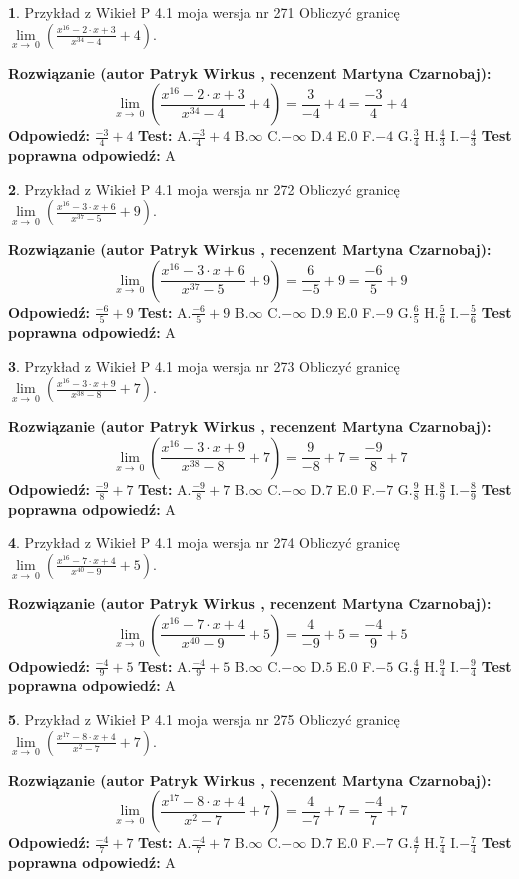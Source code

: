 \documentclass[12pt, a4paper]{article}
\theoremstyle{definition} %
\newtheorem{zad}{}
\newcommand{\zadStart}[1]{\begin{zad}#1\newline}
\newcommand{\zadStop}{\end{zad}}
\newcommand{\rozwStart}[2]{\noindent \textbf{Rozwiązanie (autor #1 , recenzent #2): }\newline}
\newcommand{\rozwStop}{\newline}
\newcommand{\odpStart}{\noindent \textbf{Odpowiedź:}\newline}
\newcommand{\odpStop}{\newline}
\newcommand{\testStart}{\noindent \textbf{Test:}\newline}
\newcommand{\testStop}{\newline}
\newcommand{\kluczStart}{\noindent \textbf{Test poprawna odpowiedź:}\newline}
\newcommand{\kluczStop}{\newline}
\begin{document}
\zadStart{Przykład z Wikieł P 4.1 moja wersja nr 271}
Obliczyć granicę $\lim\limits_{x\to\ 0}(\frac{x^{16}-2 \cdot x +3}{x^{34}-4}+4)$.
\zadStop
\rozwStart{Patryk Wirkus}{Martyna Czarnobaj}
$$\lim\limits_{x\to\ 0}(\frac{x^{16}-2 \cdot x +3}{x^{34}-4}+4)=\frac{3}{-4}+4=\frac{-3}{4}+4$$
\rozwStop
\odpStart
$\frac{-3}{4}+4$
\odpStop
\testStart
A.$\frac{-3}{4}+4$
B.$\infty$
C.$-\infty$
D.$4$
E.$0$
F.$-4$
G.$\frac{3}{4}$
H.$\frac{4}{3}$
I.$-\frac{4}{3}$
\testStop
\kluczStart
A
\kluczStop



\zadStart{Przykład z Wikieł P 4.1 moja wersja nr 272}
Obliczyć granicę $\lim\limits_{x\to\ 0}(\frac{x^{16}-3 \cdot x +6}{x^{37}-5}+9)$.
\zadStop
\rozwStart{Patryk Wirkus}{Martyna Czarnobaj}
$$\lim\limits_{x\to\ 0}(\frac{x^{16}-3 \cdot x +6}{x^{37}-5}+9)=\frac{6}{-5}+9=\frac{-6}{5}+9$$
\rozwStop
\odpStart
$\frac{-6}{5}+9$
\odpStop
\testStart
A.$\frac{-6}{5}+9$
B.$\infty$
C.$-\infty$
D.$9$
E.$0$
F.$-9$
G.$\frac{6}{5}$
H.$\frac{5}{6}$
I.$-\frac{5}{6}$
\testStop
\kluczStart
A
\kluczStop



\zadStart{Przykład z Wikieł P 4.1 moja wersja nr 273}
Obliczyć granicę $\lim\limits_{x\to\ 0}(\frac{x^{16}-3 \cdot x +9}{x^{38}-8}+7)$.
\zadStop
\rozwStart{Patryk Wirkus}{Martyna Czarnobaj}
$$\lim\limits_{x\to\ 0}(\frac{x^{16}-3 \cdot x +9}{x^{38}-8}+7)=\frac{9}{-8}+7=\frac{-9}{8}+7$$
\rozwStop
\odpStart
$\frac{-9}{8}+7$
\odpStop
\testStart
A.$\frac{-9}{8}+7$
B.$\infty$
C.$-\infty$
D.$7$
E.$0$
F.$-7$
G.$\frac{9}{8}$
H.$\frac{8}{9}$
I.$-\frac{8}{9}$
\testStop
\kluczStart
A
\kluczStop



\zadStart{Przykład z Wikieł P 4.1 moja wersja nr 274}
Obliczyć granicę $\lim\limits_{x\to\ 0}(\frac{x^{16}-7 \cdot x +4}{x^{40}-9}+5)$.
\zadStop
\rozwStart{Patryk Wirkus}{Martyna Czarnobaj}
$$\lim\limits_{x\to\ 0}(\frac{x^{16}-7 \cdot x +4}{x^{40}-9}+5)=\frac{4}{-9}+5=\frac{-4}{9}+5$$
\rozwStop
\odpStart
$\frac{-4}{9}+5$
\odpStop
\testStart
A.$\frac{-4}{9}+5$
B.$\infty$
C.$-\infty$
D.$5$
E.$0$
F.$-5$
G.$\frac{4}{9}$
H.$\frac{9}{4}$
I.$-\frac{9}{4}$
\testStop
\kluczStart
A
\kluczStop



\zadStart{Przykład z Wikieł P 4.1 moja wersja nr 275}
Obliczyć granicę $\lim\limits_{x\to\ 0}(\frac{x^{17}-8 \cdot x +4}{x^{2}-7}+7)$.
\zadStop
\rozwStart{Patryk Wirkus}{Martyna Czarnobaj}
$$\lim\limits_{x\to\ 0}(\frac{x^{17}-8 \cdot x +4}{x^{2}-7}+7)=\frac{4}{-7}+7=\frac{-4}{7}+7$$
\rozwStop
\odpStart
$\frac{-4}{7}+7$
\odpStop
\testStart
A.$\frac{-4}{7}+7$
B.$\infty$
C.$-\infty$
D.$7$
E.$0$
F.$-7$
G.$\frac{4}{7}$
H.$\frac{7}{4}$
I.$-\frac{7}{4}$
\testStop
\kluczStart
A
\kluczStop
\end{document}
